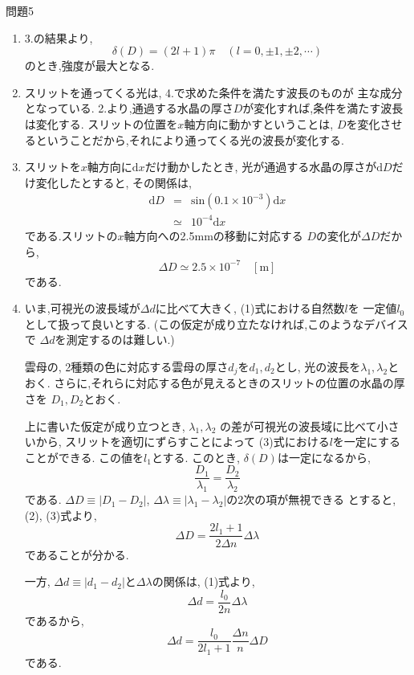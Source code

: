 \documentclass[fleqn]{jbook}
\begin{document}
\begin{answer}{問題5}{}
\begin{enumerate}
 $\alpha(D, t)$を変形すると,
\[
 \frac{A}{2} \alpha(D, t) = 
 A' \mathrm{cos}(\Phi(D, t) -\phi)
\]
\[
 \left(\quad A' \equiv A\sqrt{ \frac{1-\mathrm{cos}(\delta(D))}{2} }
 \quad \right)
\]
\[
 \left( \quad
 \mathrm{sin}\phi = \frac{\mathrm{sin}(\delta(D))}{A'}, \quad 
 \mathrm{cos}\phi = \frac{1-\mathrm{cos}(\delta(D))}{A'}
 \quad \right)
\]
となる.よって,強度$I=(\epsilon_0/2)A'{}^2$は,
\[
 I = \frac{\epsilon_0}{2}\frac{1-\mathrm{cos}(\delta(D))}{2} A^2
\]
となる.

\item
3.の結果より,
\begin{equation}
 \delta(D) = (2l+1) \pi \quad (l = 0, \pm 1, \pm 2, \cdots)
\end{equation}
のとき,強度が最大となる.

\item
スリットを通ってくる光は, 4.で求めた条件を満たす波長のものが
主な成分となっている.
2.より,通過する水晶の厚さ$D$が変化すれば,条件を満たす波長は変化する.
スリットの位置を$x$軸方向に動かすということは,
 $D$を変化させるということだから,それにより通ってくる光の波長が変化する.

\item
スリットを$x$軸方向に$\mathrm{d}x$だけ動かしたとき,
光が通過する水晶の厚さが$\mathrm{d}D$だけ変化したとすると,
その関係は,
\begin{eqnarray*}
 \mathrm{d}D & = & \mathrm{sin}(0.1 \times 10^{-3}) \mathrm{d}x
  \\
 & \simeq & 10^{-4} \mathrm{d}x
\end{eqnarray*}
である.スリットの$x$軸方向への2.5mmの移動に対応する
$D$の変化が$\Delta \! D$だから,
\[
 \Delta \! D \simeq 2.5 \times 10^{-7} \quad [\mathrm{m}]
\]
である.

\item
いま,可視光の波長域が$\Delta \! d$に比べて大きく,
 (1)式における自然数$l$を
一定値$l_0$として扱って良いとする.
 (この仮定が成り立たなければ,このようなデバイスで
$\Delta \! d$を測定するのは難しい.) 
\par
雲母の, 2種類の色に対応する雲母の厚さ$d_j$を$d_1, d_2$とし,
光の波長を$\lambda_1, \lambda_2$とおく.
さらに,それらに対応する色が見えるときのスリットの位置の水晶の厚さを
$D_1, D_2$とおく.
\par
上に書いた仮定が成り立つとき, $\lambda_1, \lambda_2$
の差が可視光の波長域に比べて小さいから,
スリットを適切にずらすことによって
(3)式における$l$を一定にすることができる.
この値を$l_1$とする.
このとき, $\delta(D)$は一定になるから,
\[
 \frac{D_1}{\lambda_1} = \frac{D_2}{\lambda_2}
\]
である.
 $\Delta \! D \equiv |D_1 - D_2|$, 
$\Delta \! \lambda \equiv |\lambda_1 - \lambda_2|$の2次の項が無視できる
 とすると, (2), (3)式より,
\[
 \Delta \! D = \frac{2 l_1 + 1}{2 \Delta \! n} \Delta \! \lambda
\]
であることが分かる.
\par
一方, $\Delta \! d \equiv |d_1 - d_2|$と$\Delta \! \lambda$の関係は,
 (1)式より,
\[
 \Delta \! d = \frac{l_0}{2n} \Delta \! \lambda
\]
であるから,
\begin{equation}
 \Delta \! d = \frac{l_0}{2 l_1 + 1} \frac{\Delta \! n}{n} \Delta \! D
\end{equation}
である.


\end{enumerate}
\end{answer}
\end{document}

